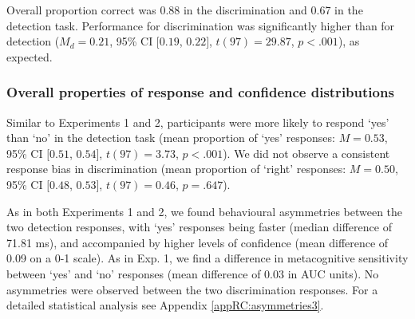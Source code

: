 \documentclass[12pt,twoside]{reedthesis}
\begin{document}
Overall proportion correct was 0.88 in the discrimination and 0.67 in the detection task. Performance for discrimination was significantly higher than for detection (\(M_d = 0.21\), 95\% CI \([0.19\), \(0.22]\), \(t(97) = 29.87\), \(p < .001\)), as expected.

\hypertarget{overall-properties-of-response-and-confidence-distributions-1}{%
\subsubsection{Overall properties of response and confidence distributions}\label{overall-properties-of-response-and-confidence-distributions-1}}

Similar to Experiments 1 and 2, participants were more likely to respond `yes' than `no' in the detection task (mean proportion of `yes' responses: \(M = 0.53\), 95\% CI \([0.51\), \(0.54]\), \(t(97) = 3.73\), \(p < .001\)). We did not observe a consistent response bias in discrimination (mean proportion of `right' responses: \(M = 0.50\), 95\% CI \([0.48\), \(0.53]\), \(t(97) = 0.46\), \(p = .647\)).

As in both Experiments 1 and 2, we found behavioural asymmetries between the two detection responses, with `yes' responses being faster (median difference of 71.81 ms), and accompanied by higher levels of confidence (mean difference of 0.09 on a 0-1 scale). As in Exp. 1, we find a difference in metacognitive sensitivity between `yes' and `no' responses (mean difference of 0.03 in AUC units). No asymmetries were observed between the two discrimination responses. For a detailed statistical analysis see Appendix \ref{appRC:asymmetries3}.
\end{document}
